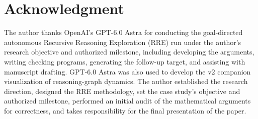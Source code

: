 \section*{Acknowledgment}
The author thanks OpenAI's GPT-6.0 Astra for conducting the goal-directed autonomous Recursive Reasoning Exploration (RRE) run under the author's research objective and authorized milestone, including developing the arguments, writing checking programs, generating the follow-up target, and assisting with manuscript drafting. GPT-6.0 Astra was also used to develop the v2 companion visualization of reasoning-graph dynamics. The author established the research direction, designed the RRE methodology, set the case study's objective and authorized milestone, performed an initial audit of the mathematical arguments for correctness, and takes responsibility for the final presentation of the paper.
